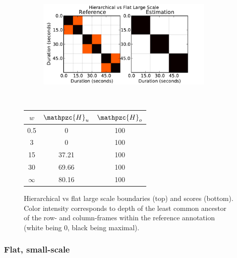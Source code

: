 \documentclass{article}
\def\shag{\ensuremath{\mathpzc{H}}}
\begin{document}
\begin{figure}
  \centering
  \begin{subfigure}{0.5\textwidth}
    \centering
    \includegraphics[width=0.94\textwidth]{plots/hier-flatlarge.pdf}
  \end{subfigure}%
  \\
  \begin{minipage}{0.5\textwidth}
    \centering
    \vspace{10pt}
    \begin{tabular}{|c|c|c|}
      \hline
      $w$       & $\shag_u$    & $\shag_o$      \\
      \hline
      0.5       & 0         & 100      \\     
      3         & 0         & 100      \\
      15        & 37.21     & 100    \\
      30        & 69.66     & 100    \\
      $\infty$  & 80.16     & 100    \\
      \hline
    \end{tabular}
  \end{minipage}
  \caption{Hierarchical vs flat large scale boundaries (top) and scores (bottom).  Color intensity corresponds to depth of the least common ancestor of the row- and column-frames 
  within the reference annotation (white being 0, black being maximal).}
  \label{fig:hier-flatlarge}
\end{figure}

\subsubsection{Flat, small-scale}
\end{document}
